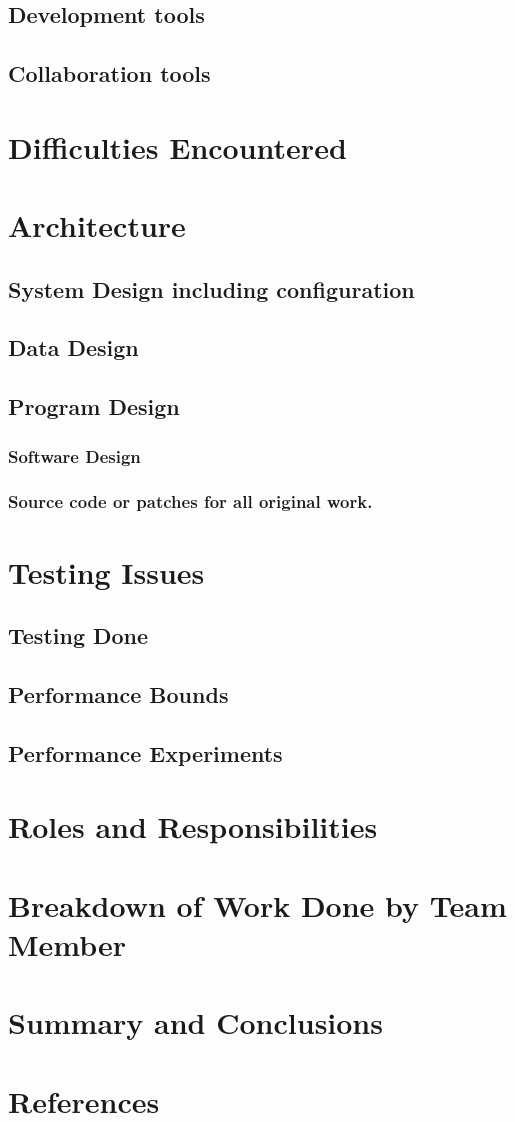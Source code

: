 \documentclass[11pt,a4paper,titlepage]{report}
\begin{document}
\subsection{Development tools}
\subsection{Collaboration tools}
\section{Difficulties Encountered}
\section{Architecture}
\subsection{System Design including configuration}
\subsection{Data Design}
\subsection{Program Design}
\subsubsection{Software Design}
\subsubsection{Source code or patches for all original work.}
\section{Testing Issues}
\subsection{Testing Done}
\subsection{Performance Bounds}
\subsection{Performance Experiments}
\section{Roles and Responsibilities}
\section{Breakdown of Work Done by Team Member}
\section{Summary and Conclusions}
\section{References}




\nocite{*}
\printbibliography[heading=bibintoc]
\end{document}
